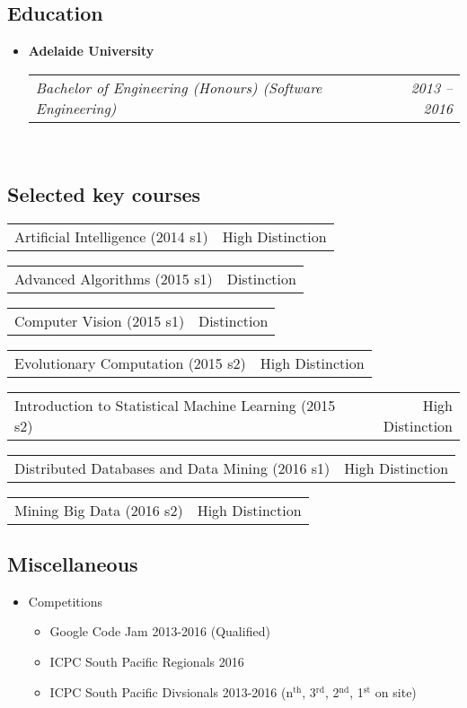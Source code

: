 \documentclass[10pt,letterpaper]{article}
\makeatletter
\newcommand{\headerrow}[2]
{\begin{tabular*}{\linewidth}{l@{\extracolsep{\fill}}r}
  #1 &
  #2 \\
\end{tabular*}}
\makeatother
\begin{document}
  \subsection*{Education}
  \begin{itemize}
    \parskip=0.1em

    \item
    {\textbf{Adelaide University}}
    \\
    \headerrow
      {\emph{Bachelor of Engineering (Honours) (Software Engineering)}}
      {\emph{2013 -- 2016}}
    \\

  \end{itemize}
  \subsection*{Selected key courses}
  \begin{itemize*}
    \item \headerrow
      {Artificial Intelligence (2014 s1)}
      {High Distinction}
    \item \headerrow
      {Advanced Algorithms (2015 s1)}
      {Distinction}
    \item \headerrow
      {Computer Vision (2015 s1)}
      {Distinction}
    \item \headerrow
      {Evolutionary Computation (2015 s2)}
      {High Distinction}
    \item \headerrow
      {Introduction to Statistical Machine Learning (2015 s2)}
      {High Distinction}
    \item \headerrow
      {Distributed Databases and Data Mining (2016 s1)}
      {High Distinction}
    \item \headerrow
      {Mining Big Data (2016 s2)}
      {High Distinction}
  \end{itemize*}

  \subsection*{Miscellaneous}
  \begin{itemize}
    \item Competitions
      \begin{itemize}
        \item Google Code Jam 2013-2016 (Qualified)
        \item ICPC South Pacific Regionals 2016
        \item ICPC South Pacific Divsionals 2013-2016 (n$^\textrm{th}$, 3$^\textrm{rd}$, 2$^\textrm{nd}$, 1$^\textrm{st}$ on site)
      \end{itemize}
  \end{itemize}
\end{document}
